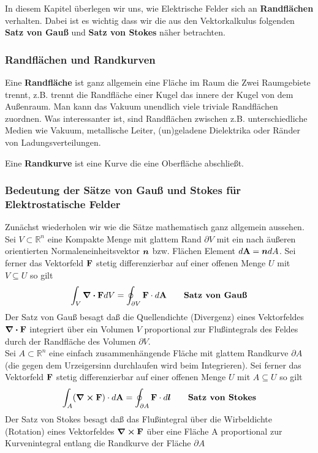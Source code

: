 In diesem Kapitel überlegen wir uns, wie Elektrische Felder sich an 
\textbf{Randflächen} verhalten. Dabei ist es wichtig dass wir die aus den
Vektorkalkulus folgenden \textbf{Satz von Gauß} und \textbf{Satz von Stokes}
näher betrachten.

\subsubsection{Randflächen und Randkurven}%

Eine \textbf{Randfläche} ist ganz allgemein eine Fläche im Raum die Zwei 
Raumgebiete trennt, z.B. trennt die Randfläche einer Kugel das innere der
Kugel von dem Außenraum. 
Man kann das Vakuum unendlich viele triviale Randflächen
zuordnen. Was interessanter ist, sind Randflächen zwischen z.B. 
unterschiedliche Medien wie Vakuum, metallische Leiter, (un)geladene 
Dielektrika oder Ränder von Ladungsverteilungen. 

Eine \textbf{Randkurve} ist eine Kurve die eine Oberfläche abschließt. 

\subsubsection{Bedeutung der Sätze von Gauß und Stokes für Elektrostatische 
Felder}%
Zunächst wiederholen wir wie die Sätze mathematisch ganz 
allgemein aussehen.\\

\noindent
Sei $V\subset \mathbb{R}^n$ eine Kompakte Menge mit glattem Rand 
$\partial V$ mit ein nach äußeren orientierten Normaleneinheitsvektor 
$\vb*n$ bzw. Flächen Element $d\vb A =  \vb*n dA$. Sei ferner das Vektorfeld
$\vb F$ stetig differenzierbar auf einer offenen Menge $U$ 
mit $V\subseteq U$ so gilt
\begin{equation}
  \int_V \div \vb FdV  = \oint_{\partial V} \vb F \cdot d\vb A 
  \qquad \textrm{\textbf{Satz von Gauß}}
\end{equation}
Der Satz von Gauß besagt daß die Quellendichte (Divergenz) eines 
Vektorfeldes $\div \vb F$
integriert über ein Volumen $V$ proportional zur Flußintegrals 
des Feldes durch der Randfläche des Volumen $\partial V$.\\

\noindent
Sei $A\subset \mathbb{R}^n$ eine einfach zusammenhängende Fläche mit
glattem Randkurve $\partial A$ (die gegen dem Urzeigersinn durchlaufen 
wird beim Integrieren). Sei ferner das Vektorfeld
$\vb F$ stetig differenzierbar auf einer offenen Menge $U$ 
mit $A\subseteq U$ so gilt
\begin{equation}
  \int_A (\curl \vb F) \cdot d\vb A= \oint_{\partial A} \vb F \cdot d\vb*l 
  \qquad \textrm{\textbf{Satz von Stokes}}
\end{equation}
Der Satz von Stokes besagt daß das Flußintegral über die Wirbeldichte 
(Rotation) eines
Vektorfeldes $\curl \vb F$ über eine Fläche A proportional zur 
Kurvenintegral entlang die Randkurve der Fläche $\partial A$

